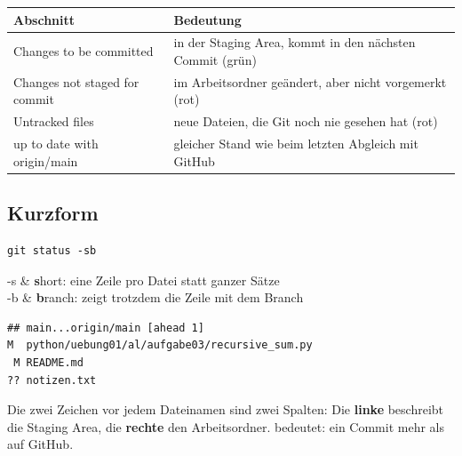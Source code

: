 \begin{center}
\renewcommand{\arraystretch}{1.3}
\begin{tabularx}{\linewidth}{@{}>{\raggedright\arraybackslash}p{4.6cm}>{\raggedright\arraybackslash}X@{}}
  \toprule
  \textbf{Abschnitt} & \textbf{Bedeutung} \\
  \midrule
  Changes to be committed      & in der Staging Area, kommt in den nächsten Commit (grün) \\
  Changes not staged for commit& im Arbeitsordner geändert, aber nicht vorgemerkt (rot) \\
  Untracked files              & neue Dateien, die Git noch nie gesehen hat (rot) \\
  up to date with origin/main  & gleicher Stand wie beim letzten Abgleich mit GitHub \\
  \bottomrule
\end{tabularx}
\end{center}

\subsection*{Kurzform}

\begin{lstlisting}[style=befehle]
git status -sb
\end{lstlisting}

\begin{teile}
  -s  & \textbf{s}hort: eine Zeile pro Datei statt ganzer Sätze \\
  -b  & \textbf{b}ranch: zeigt trotzdem die Zeile mit dem Branch \\
\end{teile}

\begin{lstlisting}[style=ausgabe]
## main...origin/main [ahead 1]
M  python/uebung01/al/aufgabe03/recursive_sum.py
 M README.md
?? notizen.txt
\end{lstlisting}

Die zwei Zeichen vor jedem Dateinamen sind zwei Spalten: Die \textbf{linke} beschreibt die
Staging Area, die \textbf{rechte} den Arbeitsordner. \cmd{[ahead 1]} bedeutet: ein Commit
mehr als auf GitHub.

